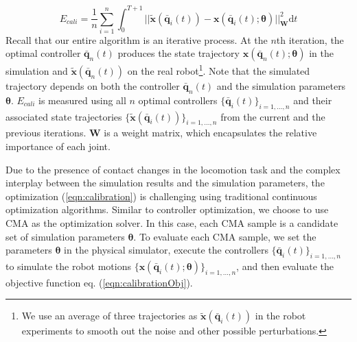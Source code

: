 \begin{equation}
  E_{cali}=\frac{1}{n}\sum_{i=1}^{n}\int_{0}^{T+1}||\tilde{\mathbf{x}}(\bar{\mathbf{q}}_i(t))-\mathbf{x}(\bar{\mathbf{q}}_i(t);\boldsymbol{\theta})||_{\mathbf{W}}^2\mathrm{d}t
  \label{eqn:calibrationObj}
\end{equation}
Recall that our entire algorithm is an iterative process. At the $n$th iteration, the optimal controller $\bar{\mathbf{q}}_n(t)$ produces the state trajectory $\mathbf{x}(\bar{\mathbf{q}}_n(t);\boldsymbol{\theta})$ in the simulation and $\tilde{\mathbf{x}}(\bar{\mathbf{q}}_n(t))$ on the real robot\footnote{We use an average of three trajectories as $\tilde{\mathbf{x}}(\bar{\mathbf{q}}_i(t))$ in the robot experiments to smooth out the noise and other possible perturbations.}. Note that the simulated trajectory depends on both the controller $\bar{\mathbf{q}}_n(t)$ and the simulation parameters $\boldsymbol{\theta}$. $E_{cali}$ is measured using all $n$ optimal controllers $\{\bar{\mathbf{q}}_i(t)\}_{i=1,...,n}$ and their associated state trajectories $\{\tilde{\mathbf{x}}(\bar{\mathbf{q}}_i(t))\}_{i=1,...,n}$ from the current and the previous iterations. $\mathbf{W}$ is a weight matrix, which encapsulates the relative importance of each joint.

Due to the presence of contact changes in the locomotion task and the complex interplay between the simulation results and the simulation parameters, the optimization (\ref{eqn:calibration}) is challenging using traditional continuous optimization algorithms. Similar to controller optimization, we choose to use CMA as the optimization solver. In this case, each CMA sample is a candidate set of simulation parameters $\boldsymbol{\theta}$. To evaluate each CMA sample, we set the parameters $\boldsymbol{\theta}$ in the physical simulator, execute the controllers $\{\bar{\mathbf{q}}_i(t)\}_{i=1,...,n}$ to simulate the robot motions $\{\mathbf{x}(\bar{\mathbf{q}}_i(t);\boldsymbol{\theta})\}_{i=1,...,n}$, and then evaluate the objective function eq. (\ref{eqn:calibrationObj}).


